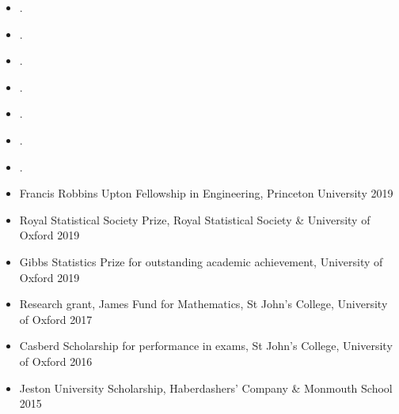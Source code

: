 \documentclass[
  date,
  number,
]{wgu-cv}
\begin{document}
\begin{itemize}
\item {}.
\end{itemize}


\begin{itemize}
\item {}.
\end{itemize}


\begin{itemize}
  \item {}.
  \item {}.
  \item {}.
\end{itemize}


\pagebreak
{}
\begin{itemize}
  \item {}.
  \item {}.
\end{itemize}



\begin{itemize}
  \item Francis Robbins Upton Fellowship in Engineering,
    Princeton University
    \hfill 2019%
  \item Royal Statistical Society Prize,
    Royal Statistical Society \& University of Oxford
    \hfill 2019%
  \item Gibbs Statistics Prize for outstanding academic achievement,
    University of Oxford
    \hfill 2019%
	\item Research grant, James Fund for Mathematics,
    St John's College, University of Oxford
    \hfill 2017%
	\item Casberd Scholarship for performance in exams,
    St John's College, University of Oxford
    \hfill 2016%
  \item Jeston University Scholarship,
    Haberdashers' Company \& Monmouth School
    \hfill 2015%
\end{itemize}
\end{document}
